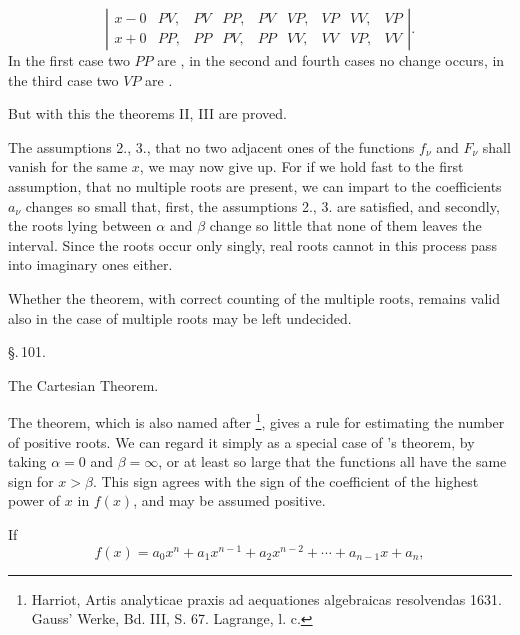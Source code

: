 \[
\left|\begin{array}{c|cc|cc|cc|cc}
x-0 & PV, & PV & PP, & PV & VP, & VP & VV, & VP \\ \hline
x+0 & PP, & PP & PV, & PP & VV, & VV & VP, & VV
\end{array}\right|
\text{.}
\]
In the first case two $PP$ are , in the second and fourth cases no change occurs, in the third case two $VP$ are .

But with this the theorems II, III are proved.

The assumptions 2., 3., that no two adjacent ones of the functions $f_\nu$ and $F_\nu$ shall vanish for the same $x$, we may now give up. For if we hold fast to the first assumption, that no multiple roots are present, we can impart to the coefficients $a_\nu$ changes so small that, first, the assumptions 2., 3. are satisfied, and secondly, the roots lying between $\alpha$ and $\beta$ change so little that none of them leaves the interval. Since the roots occur only singly, real roots cannot in this process pass into imaginary ones either.

Whether the theorem, with correct counting of the multiple roots, remains valid also in the case of multiple roots may be left undecided.

\begin{center}
\S.\,101.

The Cartesian Theorem.
\end{center}

The  theorem, which is also named after \footnote{Harriot, Artis analyticae praxis ad aequationes algebraicas resolvendas 1631. Gauss' Werke, Bd. III, S. 67. Lagrange, l. c.}, gives a rule for estimating the number of positive roots. We can regard it simply as a special case of 's theorem, by taking $\alpha = 0$ and $\beta = \infty$, or at least so large that the functions
all have the same sign for $x > \beta$. This sign agrees with the sign of the coefficient of the highest power of $x$ in $f(x)$, and may be assumed positive.

If
\[
f(x) = a_0 x^n + a_1 x^{n-1} + a_2 x^{n-2} + \cdots + a_{n-1} x + a_n,
\]
